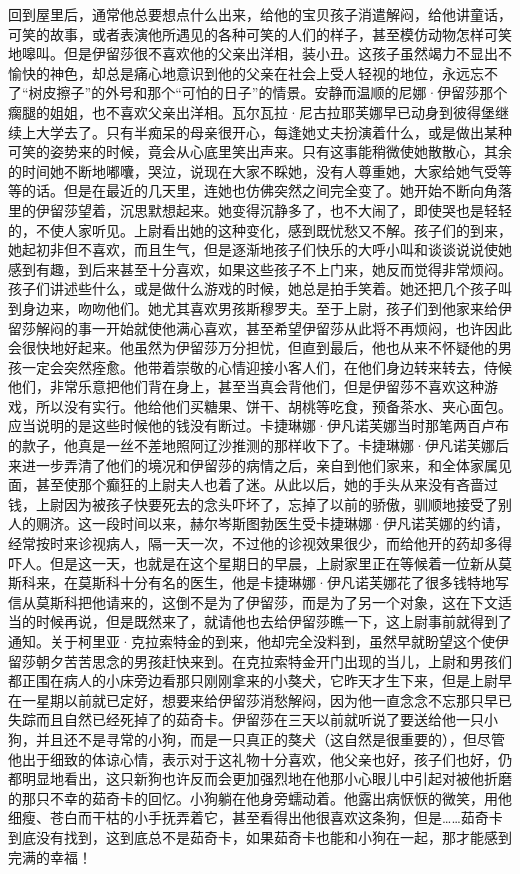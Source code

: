 \par 回到屋里后，通常他总要想点什么出来，给他的宝贝孩子消遣解闷，给他讲童话，可笑的故事，或者表演他所遇见的各种可笑的人们的样子，甚至模仿动物怎样可笑地嗥叫。但是伊留莎很不喜欢他的父亲出洋相，装小丑。这孩子虽然竭力不显出不愉快的神色，却总是痛心地意识到他的父亲在社会上受人轻视的地位，永远忘不了“树皮擦子”的外号和那个“可怕的日子”的情景。安静而温顺的尼娜·伊留莎那个瘸腿的姐姐，也不喜欢父亲出洋相。瓦尔瓦拉·尼古拉耶芙娜早已动身到彼得堡继续上大学去了。只有半痴呆的母亲很开心，每逢她丈夫扮演着什么，或是做出某种可笑的姿势来的时候，竟会从心底里笑出声来。只有这事能稍微使她散散心，其余的时间她不断地嘟囔，哭泣，说现在大家不睬她，没有人尊重她，大家给她气受等等的话。但是在最近的几天里，连她也仿佛突然之间完全变了。她开始不断向角落里的伊留莎望着，沉思默想起来。她变得沉静多了，也不大闹了，即使哭也是轻轻的，不使人家听见。上尉看出她的这种变化，感到既忧愁又不解。孩子们的到来，她起初非但不喜欢，而且生气，但是逐渐地孩子们快乐的大呼小叫和谈谈说说使她感到有趣，到后来甚至十分喜欢，如果这些孩子不上门来，她反而觉得非常烦闷。孩子们讲述些什么，或是做什么游戏的时候，她总是拍手笑着。她还把几个孩子叫到身边来，吻吻他们。她尤其喜欢男孩斯穆罗夫。至于上尉，孩子们到他家来给伊留莎解闷的事一开始就使他满心喜欢，甚至希望伊留莎从此将不再烦闷，也许因此会很快地好起来。他虽然为伊留莎万分担忧，但直到最后，他也从来不怀疑他的男孩一定会突然痊愈。他带着崇敬的心情迎接小客人们，在他们身边转来转去，侍候他们，非常乐意把他们背在身上，甚至当真会背他们，但是伊留莎不喜欢这种游戏，所以没有实行。他给他们买糖果、饼干、胡桃等吃食，预备茶水、夹心面包。应当说明的是这些时候他的钱没有断过。卡捷琳娜·伊凡诺芙娜当时那笔两百卢布的款子，他真是一丝不差地照阿辽沙推测的那样收下了。卡捷琳娜·伊凡诺芙娜后来进一步弄清了他们的境况和伊留莎的病情之后，亲自到他们家来，和全体家属见面，甚至使那个癫狂的上尉夫人也着了迷。从此以后，她的手头从来没有吝啬过钱，上尉因为被孩子快要死去的念头吓坏了，忘掉了以前的骄傲，驯顺地接受了别人的赒济。这一段时间以来，赫尔岑斯图勃医生受卡捷琳娜·伊凡诺芙娜的约请，经常按时来诊视病人，隔一天一次，不过他的诊视效果很少，而给他开的药却多得吓人。但是这一天，也就是在这个星期日的早晨，上尉家里正在等候着一位新从莫斯科来，在莫斯科十分有名的医生，他是卡捷琳娜·伊凡诺芙娜花了很多钱特地写信从莫斯科把他请来的，这倒不是为了伊留莎，而是为了另一个对象，这在下文适当的时候再说，但是既然来了，就请他也去给伊留莎瞧一下，这上尉事前就得到了通知。关于柯里亚·克拉索特金的到来，他却完全没料到，虽然早就盼望这个使伊留莎朝夕苦苦思念的男孩赶快来到。在克拉索特金开门出现的当儿，上尉和男孩们都正围在病人的小床旁边看那只刚刚拿来的小獒犬，它昨天才生下来，但是上尉早在一星期以前就已定好，想要来给伊留莎消愁解闷，因为他一直念念不忘那只早已失踪而且自然已经死掉了的茹奇卡。伊留莎在三天以前就听说了要送给他一只小狗，并且还不是寻常的小狗，而是一只真正的獒犬（这自然是很重要的），但尽管他出于细致的体谅心情，表示对于这礼物十分喜欢，他父亲也好，孩子们也好，仍都明显地看出，这只新狗也许反而会更加强烈地在他那小心眼儿中引起对被他折磨的那只不幸的茹奇卡的回忆。小狗躺在他身旁蠕动着。他露出病恹恹的微笑，用他细瘦、苍白而干枯的小手抚弄着它，甚至看得出他很喜欢这条狗，但是……茹奇卡到底没有找到，这到底总不是茹奇卡，如果茹奇卡也能和小狗在一起，那才能感到完满的幸福！

